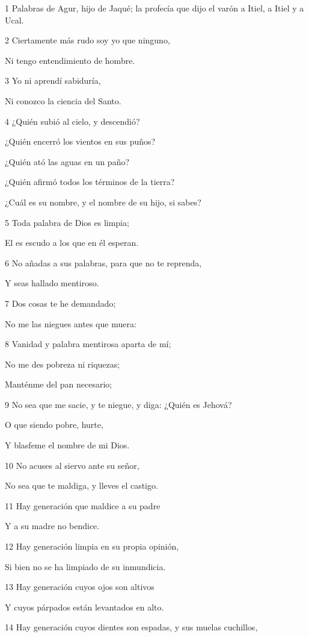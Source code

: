 \par 1 Palabras de Agur, hijo de Jaqué; la profecía que dijo el varón a Itiel, a Itiel y a Ucal.
\par 2 Ciertamente más rudo soy yo que ninguno,
\par Ni tengo entendimiento de hombre.
\par 3 Yo ni aprendí sabiduría, 
\par Ni conozco la ciencia del Santo.
\par 4 ¿Quién subió al cielo, y descendió?
\par ¿Quién encerró los vientos en sus puños?
\par ¿Quién ató las aguas en un paño?
\par ¿Quién afirmó todos los términos de la tierra?
\par ¿Cuál es su nombre, y el nombre de su hijo, si sabes?
\par 5 Toda palabra de Dios es limpia;
\par El es escudo a los que en él esperan.
\par 6 No añadas a sus palabras, para que no te reprenda,
\par Y seas hallado mentiroso.
\par 7 Dos cosas te he demandado;
\par No me las niegues antes que muera:
\par 8 Vanidad y palabra mentirosa aparta de mí;
\par No me des pobreza ni riquezas;
\par Manténme del pan necesario;
\par 9 No sea que me sacie, y te niegue, y diga: ¿Quién es Jehová?
\par O que siendo pobre, hurte,
\par Y blasfeme el nombre de mi Dios.
\par 10 No acuses al siervo ante su señor, 
\par No sea que te maldiga, y lleves el castigo.
\par 11 Hay generación que maldice a su padre
\par Y a su madre no bendice.
\par 12 Hay generación limpia en su propia opinión,
\par Si bien no se ha limpiado de su inmundicia.
\par 13 Hay generación cuyos ojos son altivos
\par Y cuyos párpados están levantados en alto.
\par 14 Hay generación cuyos dientes son espadas, y sus muelas cuchillos,
